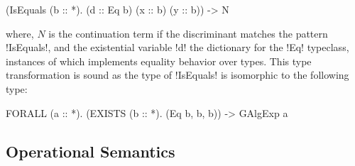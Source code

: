 \documentclass[screen,nonacm,manuscript,review]{acmart} %
\begin{document}
\begin{CenteredBox}
\begin{code}
(IsEquals (b :: *). (d :: Eq b) (x :: b) (y :: b)) -> N
\end{code}
\end{CenteredBox}

where, $N$ is the continuation term if the discriminant matches the pattern
!IsEquals!, and the existential variable !d! the dictionary for the !Eq!
typeclass, instances of which implements equality behavior over types.
This type transformation is sound as the type of !IsEquals! is
isomorphic to the following type:

\begin{CenteredBox}
\begin{code}
FORALL (a :: *). (EXISTS (b :: *). (Eq b, b, b)) -> GAlgExp a
\end{code}
\end{CenteredBox}

\subsection{Operational Semantics}\label{sec:sfc-op-sem}
\newcommand{\Beta}{
 \ib{\irule[\trule{$\beta$}]
 {};
 {$\stepsto {(\Lam {x\co\tau} M) \App N} {\Set{x\mapsto N}M}$}
 }
}
\newcommand{\TBeta}{
 \ib{\irule[\trule{Ty-$\beta$}]
 {};
 {$\stepsto {(\TLam \TyVar M) \App \tau} {\Set{\TyVar\mapsto \tau}M}$}
 }
}
\newcommand{\CaseE}{
 \ib{\irule[\trule{case}]
 {};
 {\stepsto {\Case {(H\App\many\sigma\App\many\phi\App\many\Tm)} {\Set{...; H\App\many\beta\App\many x \to N; ...}}} {\Set{\many {\beta\mapsto\phi}, \many{x\mapsto\Tm}}N}}
 }
}
\newcommand{\CoTransE}{
 \ib{\irule[\trule{Co-Trans}]
 {};
 {$\stepsto {\Cast {(\Cast \Val \Co)} {\nu}} {\Cast \Val {(\Trans{\Co} {\nu})}}$}
 }
}

\newcommand{\TyPush}{
 \ib{\irule[\trule{ty-push}];
 {$\stepsto {(\Cast{\TLam {\TyVar\co\kappa} M}\Co)\App \tau} {({\TLam {\TyVar\co\kappa} (\Cast M {\Co\At\TyVar})})\App \tau}$}
 }
}

\newcommand{\CoPush}{
 \ib{\irule[\trule{co-push}]
 {\substack {\mathlarger{\nu\co \sigma_1' \sim \sigma_2'}\\
 \mathlarger{\Co_1 : \sigma_1 \sim \sigma_1' = \Left {(\Left \Co)}}}}
 {\substack {\mathlarger{\Co\co (\sigma_1 \sim \sigma_2 \then \sigma_3) \sim (\sigma_1' \sim \sigma_2' \then \sigma_3')}\\
 \mathlarger{{\Co_2: \sigma_2 \sim \sigma_2' = \Right{(\Left\Co)}\quad{\Co_3:\sigma_3\sim\sigma_3' = \Right\Co}}}}};
 {$\stepsto {(\Cast{\TLam {\TyVar\co(\sigma_1\sim\sigma_2)} M}\Co)\App \nu} {\Cast {(\TLam {\TyVar\co(\sigma_1\sim\sigma_2)} M)\App (\Co_1 \circ \nu \circ \Sym \Co_2)} {\Co_3}} $}
 }
}
\end{document}
